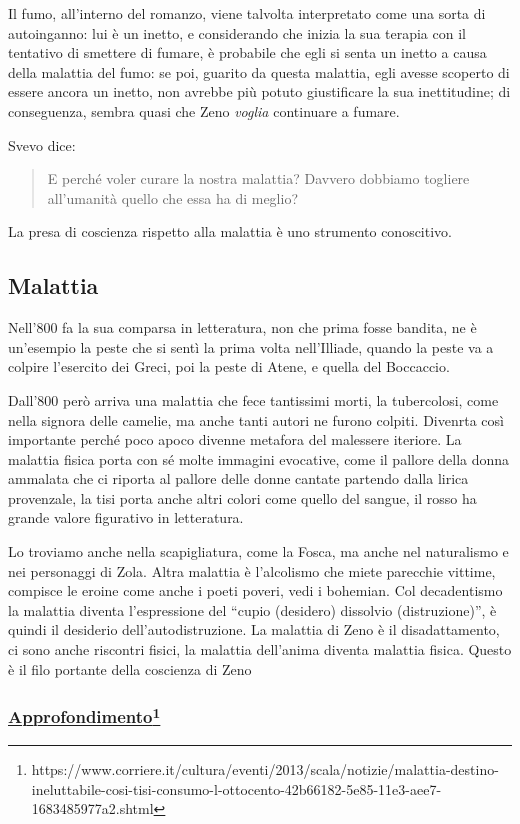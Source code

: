 \documentclass[a4paper, twoside, titlepage]{book}
\newcounter{mar}
\newcommand{\citazione}[1]{%
  \begin{quotation}
  \noindent #1
  \end{quotation}}
\begin{document}
Il fumo, all'interno del romanzo, viene talvolta interpretato come una sorta di autoinganno: lui è un inetto, e considerando che inizia la sua terapia con il tentativo di smettere di fumare, è probabile che egli si senta un inetto a causa della malattia del fumo: se poi, guarito da questa malattia, egli avesse scoperto di essere ancora un inetto, non avrebbe più potuto giustificare la sua inettitudine; di conseguenza, sembra quasi che Zeno \textit{voglia} continuare a fumare.

Svevo dice:
\citazione{E perché voler curare la nostra malattia? Davvero dobbiamo togliere all'umanità quello che essa ha di meglio?}

La presa di coscienza rispetto alla malattia è uno strumento conoscitivo.

\subsection{Malattia}

Nell’800 fa la sua comparsa in letteratura, non che prima fosse bandita, ne è un’esempio la peste che si sentì la prima volta nell’Illiade, quando la peste va a colpire l’esercito dei Greci, poi la peste di Atene, e quella del Boccaccio.

Dall’800 però arriva una malattia che fece tantissimi morti, la tubercolosi, come nella signora delle camelie, ma anche tanti autori ne furono colpiti.
Divenrta così importante perché poco  apoco divenne metafora del malessere iteriore. La malattia fisica porta con sé molte immagini evocative, come il pallore della donna ammalata che ci riporta al pallore delle donne cantate partendo dalla lirica provenzale, la tisi porta anche altri colori come quello del sangue, il rosso ha grande valore figurativo in letteratura.

Lo troviamo anche nella scapigliatura, come la Fosca, ma anche nel naturalismo e nei personaggi di Zola. Altra malattia è l’alcolismo che miete parecchie vittime, compisce le eroine come anche i poeti poveri, vedi i bohemian.
Col decadentismo la malattia diventa l’espressione del “cupio (desidero) dissolvio (distruzione)”, è quindi il desiderio dell’autodistruzione.
La malattia di Zeno è il disadattamento, ci sono anche riscontri fisici, la malattia dell’anima diventa malattia fisica. Questo è il filo portante della coscienza di Zeno

\subsubsection*{\href{https://www.corriere.it/cultura/eventi/2013/scala/notizie/malattia-destino-ineluttabile-cosi-tisi-consumo-l-ottocento-42b66182-5e85-11e3-aee7-1683485977a2.shtml}{Approfondimento}\footnote{https://www.corriere.it/cultura/eventi/2013/scala/notizie/malattia-destino-ineluttabile-cosi-tisi-consumo-l-ottocento-42b66182-5e85-11e3-aee7-1683485977a2.shtml}}
\end{document}
